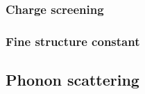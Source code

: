 \documentclass[../Matt_Gebert_Honours_Thesis.tex]{subfiles}
\begin{document}
	\subsubsection{Charge screening}
	\subsubsection{Fine structure constant}
	\subsubsection{}
	\subsection{Phonon scattering}
	\subsection{}
	
	\section{}
	
	
	
\end{document}
